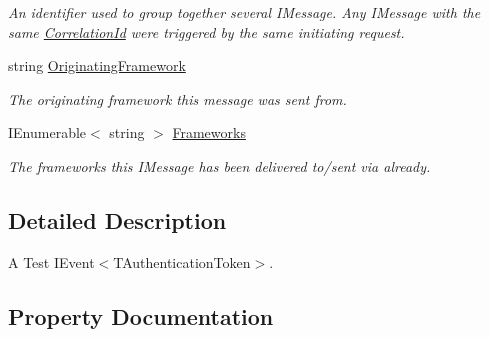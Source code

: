 \begin{DoxyCompactItemize}
\begin{DoxyCompactList}\small\item\em An identifier used to group together several I\+Message. Any I\+Message with the same \hyperlink{classCqrs_1_1Azure_1_1ServiceBus_1_1Tests_1_1Unit_1_1TestEvent_a713230eebc1d248dd7245b80553abac4_a713230eebc1d248dd7245b80553abac4}{Correlation\+Id} were triggered by the same initiating request. \end{DoxyCompactList}\item 
string \hyperlink{classCqrs_1_1Azure_1_1ServiceBus_1_1Tests_1_1Unit_1_1TestEvent_a7945da825eb0d9a101732bfb4b3d8074_a7945da825eb0d9a101732bfb4b3d8074}{Originating\+Framework}
\begin{DoxyCompactList}\small\item\em The originating framework this message was sent from. \end{DoxyCompactList}\item 
I\+Enumerable$<$ string $>$ \hyperlink{classCqrs_1_1Azure_1_1ServiceBus_1_1Tests_1_1Unit_1_1TestEvent_abbfe10acad422a8664ab50dc28f514f6_abbfe10acad422a8664ab50dc28f514f6}{Frameworks}
\begin{DoxyCompactList}\small\item\em The frameworks this I\+Message has been delivered to/sent via already. \end{DoxyCompactList}\end{DoxyCompactItemize}


\subsection{Detailed Description}
A Test I\+Event$<$\+T\+Authentication\+Token$>$. 



\subsection{Property Documentation}
\mbox{\label{classCqrs_1_1Azure_1_1ServiceBus_1_1Tests_1_1Unit_1_1TestEvent_a3cc3380a0c4a9dce42f2b306a9b6023b_a3cc3380a0c4a9dce42f2b306a9b6023b}} 
